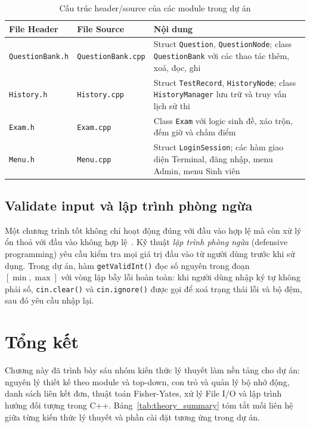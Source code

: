 \documentclass[11pt]{report}
\begin{document}
\begin{table}[H]
    \centering
    \begin{tabularx}{\textwidth}{|l|l|>{\raggedright\arraybackslash}X|} \hline
        \textbf{File Header} & \textbf{File Source} & \textbf{Nội dung} \\ \hline
        \texttt{QuestionBank.h} & \texttt{QuestionBank.cpp} & Struct \texttt{Question}, \texttt{QuestionNode}; class \texttt{QuestionBank} với các thao tác thêm, xoá, đọc, ghi \\ \hline
        \texttt{History.h} & \texttt{History.cpp} & Struct \texttt{TestRecord}, \texttt{HistoryNode}; class \texttt{HistoryManager} lưu trữ và truy vấn lịch sử thi \\ \hline
        \texttt{Exam.h} & \texttt{Exam.cpp} & Class \texttt{Exam} với logic sinh đề, xáo trộn, đếm giờ và chấm điểm \\ \hline
        \texttt{Menu.h} & \texttt{Menu.cpp} & Struct \texttt{LoginSession}; các hàm giao diện Terminal, đăng nhập, menu Admin, menu Sinh viên \\ \hline
    \end{tabularx}
    \caption{Cấu trúc header/source của các module trong dự án}
    \label{tab:modules}
\end{table}

\subsection{Validate input và lập trình phòng ngừa}

Một chương trình tốt không chỉ hoạt động đúng với đầu vào hợp lệ mà còn xử lý ổn thoả với đầu vào không hợp lệ~\cite{kernighan1999}. Kỹ thuật \textit{lập trình phòng ngừa} (defensive programming) yêu cầu kiểm tra mọi giá trị đầu vào từ người dùng trước khi sử dụng. Trong dự án, hàm \texttt{getValidInt()} đọc số nguyên trong đoạn $[\min, \max]$ với vòng lặp bẫy lỗi hoàn toàn: khi người dùng nhập ký tự không phải số, \texttt{cin.clear()} và \texttt{cin.ignore()} được gọi để xoá trạng thái lỗi và bộ đệm, sau đó yêu cầu nhập lại.

\section{Tổng kết}

Chương này đã trình bày sáu nhóm kiến thức lý thuyết làm nền tảng cho dự án: nguyên lý thiết kế theo module và top-down, con trỏ và quản lý bộ nhớ động, danh sách liên kết đơn, thuật toán Fisher-Yates, xử lý File I/O và lập trình hướng đối tượng trong C++. Bảng~\ref{tab:theory_summary} tóm tắt mối liên hệ giữa từng kiến thức lý thuyết và phần cài đặt tương ứng trong dự án.
\end{document}
